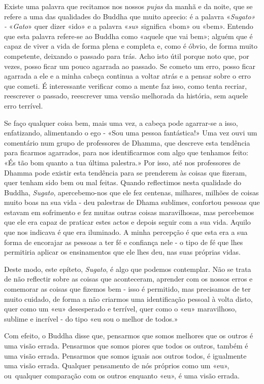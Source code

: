 Existe uma palavra que recitamos nos nossos \emph{pujas} da manhã e da
noite, que se refere a uma das qualidades do Buddha que muito aprecio: é
a palavra «\emph{Sugato» -} «\emph{Gato}» quer dizer «ido» e a palavra
«\emph{su}» significa «bom» ou «bem». Entendo que esta palavra refere-se
ao Buddha como «aquele que vai bem»; alguém que é capaz de viver a vida
de forma plena e completa e, como é óbvio, de forma muito competente,
deixando o passado para trás. Acho isto útil porque noto que, por vezes,
posso ficar um pouco agarrada ao passado. Se cometo um erro, posso ficar
agarrada a ele e a minha cabeça continua a voltar atrás e a pensar sobre
o erro que cometi. É interessante verificar como a mente faz isso, como
tenta recriar, reescrever o passado, reescrever uma versão melhorada da
história, sem aquele erro terrível.

Se faço qualquer coisa bem, mais uma vez, a cabeça pode \mbox{agarrar-se} a
isso, enfatizando, alimentando o ego - «Sou uma pessoa fantástica!» Uma
vez ouvi um comentário num grupo de professores de Dhamma, que descreve
esta tendência para ficarmos agarrados, para nos identificarmos com algo
que tenhamos feito: «És tão bom quanto a tua última palestra.» Por isso,
até nos professores de Dhamma pode existir esta tendência para se
prenderem às coisas que fizeram, quer tenham sido bem ou mal feitas.
Quando reflectimos nesta qualidade do Buddha, \emph{Sugato},
apercebemo-nos que ele fez centenas, milhares, milhões de coisas muito
boas na sua vida - deu palestras de Dhama sublimes, confortou pessoas
que estavam em sofrimento e fez muitas outras coisas maravilhosas, mas
percebemos que ele era capaz de praticar estes actos e depois seguir com
a sua vida. Aquilo que nos indicava é que era iluminado. A minha
percepção é que esta era a sua forma de encorajar as pessoas a ter fé e
confiança nele - o tipo de fé que lhes permitiria aplicar os
ensinamentos que ele lhes deu, nas suas próprias vidas.

Deste modo, este epíteto, \emph{Sugato}, é algo que podemos contemplar.
Não se trata de não reflectir sobre as coisas que aconteceram, aprender
com os nossos erros e comemorar as coisas que fizemos bem - isso é
permitido, mas precisamos de ter muito cuidado, de forma a não criarmos
uma identificação pessoal à volta disto, quer como um «eu» desesperado e
terrível, quer como o «eu» maravilhoso, sublime e incrível - do tipo «eu
sou o melhor de todos.»

Com efeito, o Buddha disse que, pensarmos que somos melhores que os
outros é uma visão errada. Pensarmos que somos piores que todos os
outros, também é uma visão errada. Pensarmos que somos iguais aos outros
todos, é igualmente uma visão errada. Qualquer pensamento de nós
próprios como um «eu», ou~qualquer comparação com os outros enquanto
«eu», é uma visão errada.

